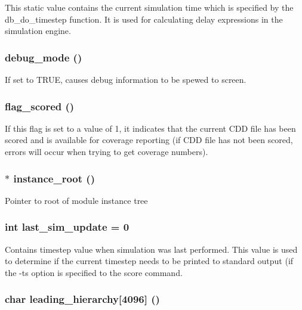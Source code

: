 This static value contains the current simulation time which is specified by the db\_\-do\_\-timestep function. It is used for calculating delay expressions in the simulation engine. 
\subsubsection{ {\bf debug\_\-mode} ()}\label{db_8c_a11}


If set to TRUE, causes debug information to be spewed to screen. 
\subsubsection{ {\bf flag\_\-scored} ()}\label{db_8c_a9}


If this flag is set to a value of 1, it indicates that the current CDD file has been scored and is available for coverage reporting (if CDD file has not been scored, errors will occur when trying to get coverage numbers). 
\subsubsection{$\ast$ {\bf instance\_\-root} ()}\label{db_8c_a1}


Pointer to root of module instance tree 
\subsubsection{\setlength{\rightskip}{0pt plus 5cm}int {\bf last\_\-sim\_\-update} = 0}\label{db_8c_a22}


Contains timestep value when simulation was last performed. This value is used to determine if the current timestep needs to be printed to standard output (if the -ts option is specified to the score command. 
\subsubsection{\setlength{\rightskip}{0pt plus 5cm}char {\bf leading\_\-hierarchy}[4096] ()}\label{db_8c_a8}


